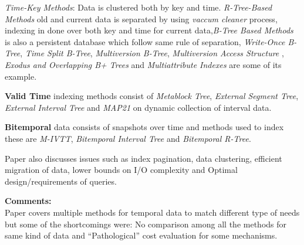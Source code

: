 \documentclass[a4paper,11pt, twoside]{article}
\begin{document}
\emph{Time-Key Methods}: Data is clustered both by key and time. \emph{R-Tree-Based Methods} old and current data is separated by using \emph{vaccum cleaner} process, indexing in done over both key and time for current data,\emph{B-Tree Based Methods} is also a persistent database which follow same rule of separation, \emph{Write-Once B-Tree}, \emph{Time Split B-Tree}, \emph{Multiversion B-Tree}, \emph{Multiversion Access Structure} , \emph{Exodus and Overlapping B+ Trees} and \emph{Multiattribute Indexes} are some of its example.

\noindent
\textbf{Valid Time} indexing methods consist of \emph{Metablock Tree}, \emph{External Segment Tree}, \emph{External Interval Tree} and \emph{MAP21} on dynamic collection of interval data.

\noindent
\textbf{Bitemporal} data consists of snapshots over time and methods used to index these are \emph{M-IVTT}, \emph{Bitemporal Interval Tree} and \emph{Bitemporal R-Tree}.

Paper also discusses issues such as index pagination, data clustering, efficient migration of data, lower bounds on I/O complexity and Optimal design/requirements of queries.

\textbf{Comments:}\\
Paper covers multiple methods for temporal data to match different type of needs but some of the shortcomings were: No comparison among all the methods for same kind of data and ``Pathological'' cost evaluation for some mechanisms.  
\end{document}
